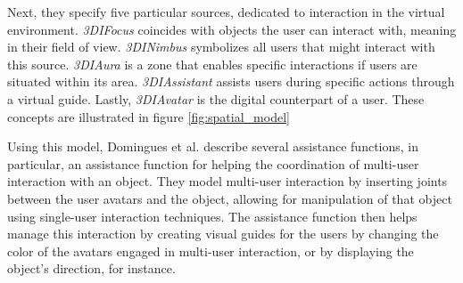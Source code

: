     Next, they specify five particular sources, dedicated to interaction in the virtual environment. \textit{3DIFocus} coincides with objects the user can interact with, meaning in their field of view. \textit{3DINimbus} symbolizes all users that might interact with this source. \textit{3DIAura} is a zone that enables specific interactions if users are situated within its area. \textit{3DIAssistant} assists users during specific actions through a virtual guide. Lastly, \textit{3DIAvatar} is the digital counterpart of a user. These concepts are illustrated in figure \ref{fig:spatial_model}

    Using this model, Domingues et al. \cite{dominguesCollaborative3DInteraction2011} describe several assistance functions, in particular, an assistance function for helping the coordination of multi-user interaction with an object. They model multi-user interaction by inserting joints between the user avatars and the object, allowing for manipulation of that object using single-user interaction techniques. The assistance function then helps manage this interaction by creating visual guides for the users by changing the color of the avatars engaged in multi-user interaction, or by displaying the object's direction, for instance.
    
